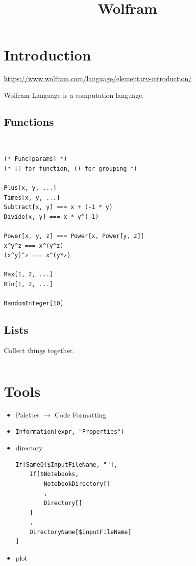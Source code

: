 \documentclass{blog}
\title{Wolfram}
\begin{document}
\maketitle
\tableofcontents
\section{Introduction}
\url{https://www.wolfram.com/language/elementary-introduction/}

\begin{definition}
    Wolfram Language is a computation language.
\end{definition}

\subsection{Functions}
\begin{definition}[function]~
    \begin{verbatim}
(* Func[params] *)
(* [] for function, () for grouping *)

Plus[x, y, ...]
Times[x, y, ...]
Subtract[x, y] === x + (-1 * y)
Divide[x, y] === x * y^(-1)

Power[x, y, z] === Power[x, Power[y, z]]
x^y^z === x^(y^z)
(x^y)^z === x^(y*z)

Max[1, 2, ...]
Min[1, 2, ...]

RandomInteger[10]
\end{verbatim}
\end{definition}

\subsection{Lists}
\begin{definition}[list]
    Collect things together.
    \begin{verbatim}

\end{verbatim}
\end{definition}

\appendix
\section{Tools}
\begin{itemize}
    \item Palettes $\to$ Code Formatting
    \item \verb|Information[expr, "Properties"]|
    \item directory
          \begin{verbatim}
If[SameQ[$InputFileName, ""],
    If[$Notebooks,
        NotebookDirectory[]
        ,
        Directory[]
    ]
    ,
    DirectoryName[$InputFileName]
]
\end{verbatim}
    \item plot
\end{itemize}

\printbibliography
\end{document}
